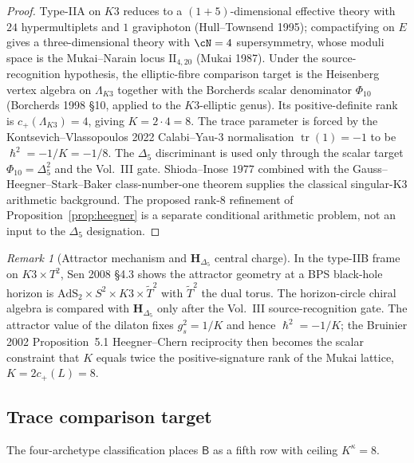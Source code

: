 \documentclass[11pt,reqno]{amsart}
\theoremstyle{plain}
\theoremstyle{definition}
\theoremstyle{remark}
\newtheorem{remark}[theorem]{Remark}
\DeclareMathOperator{\tr}{tr}
\newcommand{\AdS}{\mathrm{AdS}}
\newcommand{\sfB}{\mathsf{B}}
\newcommand{\bfH}{\mathbf{H}}
\newcommand{\hbar}{{\hslash}}
\begin{document}
\begin{proof}
Type-IIA on $K3$ reduces to a $(1+5)$-dimensional effective theory with $24$ hypermultiplets and $1$ graviphoton (Hull--Townsend 1995); compactifying on $E$ gives a three-dimensional theory with $\cN = 4$ supersymmetry, whose moduli space is the Mukai--Narain locus $\mathrm{II}_{4, 20}$ (Mukai 1987). Under the source-recognition hypothesis, the elliptic-fibre comparison target is the Heisenberg vertex algebra on $\Lambda_{K3}$ together with the Borcherds scalar denominator $\Phi_{10}$ (Borcherds 1998 \S10, applied to the $K3$-elliptic genus). Its positive-definite rank is $c_+(\Lambda_{K3}) = 4$, giving $K = 2 \cdot 4 = 8$. The trace parameter is forced by the Kontsevich--Vlassopoulos 2022 Calabi--Yau-$3$ normalisation $\tr(1) = -1$ to be $\hbar^2 = -1/K = -1/8$. The $\Delta_5$ discriminant is used only through the scalar target $\Phi_{10}=\Delta_5^2$ and the Vol.~III gate. Shioda--Inose $1977$ combined with the Gauss--Heegner--Stark--Baker class-number-one theorem supplies the classical singular-K3 arithmetic background. The proposed rank-$8$ refinement of Proposition~\ref{prop:heegner} is a separate conditional arithmetic problem, not an input to the $\Delta_5$ designation.
\end{proof}

\begin{remark}[Attractor mechanism and $\bfH_{\Delta_5}$ central charge]
\label{rem:attractor}
In the type-IIB frame on $K3 \times T^2$, Sen 2008 \S4.3 shows the attractor geometry at a BPS black-hole horizon is $\AdS_2 \times S^2 \times K3 \times \tilde T^2$ with $\tilde T^2$ the dual torus. The horizon-circle chiral algebra is compared with $\bfH_{\Delta_5}$ only after the Vol.~III source-recognition gate. The attractor value of the dilaton fixes $g_s^2 = 1/K$ and hence $\hbar^2 = -1/K$; the Bruinier 2002 Proposition~5.1 Heegner--Chern reciprocity then becomes the scalar constraint that $K$ equals twice the positive-signature rank of the Mukai lattice, $K = 2c_+(L) = 8$.
\end{remark}


\subsection{Trace comparison target}
The four-archetype classification places $\sfB$ as a fifth row with ceiling $K^\kappa = 8$.
\end{document}
